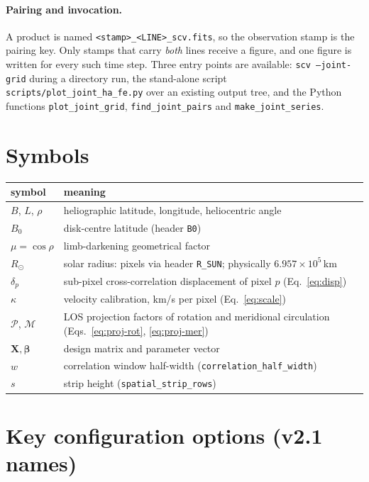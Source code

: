 \documentclass[11pt,a4paper]{article}
\newcommand{\code}[1]{\texttt{\small #1}}
\newcommand{\Rsun}{R_{\odot}}
\newcommand{\Proj}{\mathcal{P}}
\newcommand{\Merid}{\mathcal{M}}
\begin{document}
\paragraph{Pairing and invocation.}  A product is named
\code{<stamp>\_<LINE>\_scv.fits}, so the observation stamp is the pairing key.
Only stamps that carry \emph{both} lines receive a figure, and one figure is
written for every such time step.  Three entry points are available:
\code{scv --joint-grid} during a directory run, the stand-alone script
\code{scripts/plot\_joint\_ha\_fe.py} over an existing output tree, and the
Python functions \code{plot\_joint\_grid}, \code{find\_joint\_pairs} and
\code{make\_joint\_series}.


\appendix
\section{Symbols}

\begin{longtable}{@{}ll@{}}
\toprule
symbol & meaning \\
\midrule
\endhead
$B$, $L$, $\rho$ & heliographic latitude, longitude, heliocentric angle \\
$B_0$            & disk-centre latitude (header \code{B0}) \\
$\mu=\cos\rho$   & limb-darkening geometrical factor \\
$\Rsun$          & solar radius: pixels via header \code{R\_SUN}; physically
                   $6.957\times10^5$\,km \\
$\delta_p$       & sub-pixel cross-correlation displacement of pixel $p$
                   (Eq.~\eqref{eq:disp}) \\
$\kappa$         & velocity calibration, km/s per pixel (Eq.~\eqref{eq:scale}) \\
$\Proj$, $\Merid$ & LOS projection factors of rotation and meridional
                   circulation (Eqs.~\eqref{eq:proj-rot}, \eqref{eq:proj-mer}) \\
$\bm{X},\bm\beta$ & design matrix and parameter vector \\
$w$              & correlation window half-width
                   (\code{correlation\_half\_width}) \\
$s$              & strip height (\code{spatial\_strip\_rows}) \\
\bottomrule
\end{longtable}

\section{Key configuration options (v2.1 names)}
\end{document}
